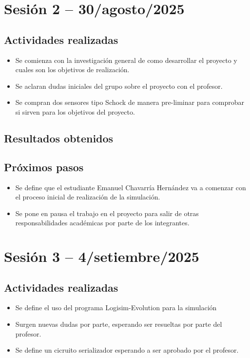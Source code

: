 \documentclass[12pt,letterpaper]{article}
\begin{document}
\newpage

\section{Sesión 2 --  30/agosto/2025}
\subsection*{Actividades realizadas}
\begin{itemize}
    \item Se comienza con la investigación general de como desarrollar el proyecto y cuales son los objetivos de realización.
    \item Se aclaran dudas iniciales del grupo sobre el proyecto con el profesor.
    \item Se compran dos sensores tipo Schock de manera pre-liminar para comprobar si sirven para los objetivos del proyecto.
\end{itemize}

\subsection*{Resultados obtenidos}

\subsection*{Próximos pasos}
\begin{itemize}
    \item Se define que el estudiante Emanuel Chavarría Hernández va a comenzar con el proceso inicial de realización de la simulación.
    \item Se pone en pausa el trabajo en el proyecto para salir de otras responsabilidades académicas por parte de los integrantes.
\end{itemize}


\section{Sesión 3 --  4/setiembre/2025}
\subsection*{Actividades realizadas}
\begin{itemize}
    \item Se define el uso del programa Logisim-Evolution para la simulación
    \item Surgen nuevas dudas por parte, esperando ser resueltas por parte del profesor.
	\item Se define un cicruito serializador esperando a ser aprobado por el profesor.
\end{itemize}
\end{document}
